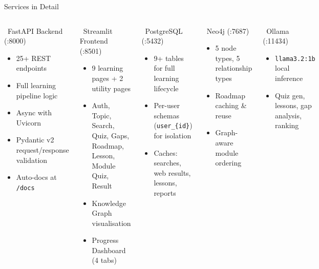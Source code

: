\documentclass[aspectratio=169,9pt]{beamer}
\begin{document}
\begin{frame}{Services in Detail}
\begin{columns}[T]
  \begin{block}{\faCode\ FastAPI Backend (:8000)}
    \begin{itemize}
      \item 25+ REST endpoints
      \item Full learning pipeline logic
      \item Async with Uvicorn
      \item Pydantic v2 request/response validation
      \item Auto-docs at \texttt{/docs}
    \end{itemize}
  \end{block}
  \begin{block}{\faDesktop\ Streamlit Frontend (:8501)}
    \begin{itemize}
      \item 9 learning pages + 2 utility pages
      \item Auth, Topic, Search, Quiz, Gaps,\\Roadmap, Lesson, Module Quiz, Result
      \item Knowledge Graph visualisation
      \item Progress Dashboard (4 tabs)
    \end{itemize}
  \end{block}

  \begin{block}{\faDatabase\ PostgreSQL (:5432)}
    \begin{itemize}
      \item 9+ tables for full learning lifecycle
      \item Per-user schemas (\texttt{user\_\{id\}}) for isolation
      \item Caches: searches, web results, lessons, reports
    \end{itemize}
  \end{block}
  \begin{block}{\faProjectDiagram\ Neo4j (:7687)}
    \begin{itemize}
      \item 5 node types, 5 relationship types
      \item Roadmap caching \& reuse
      \item Graph-aware module ordering
    \end{itemize}
  \end{block}
  \begin{block}{\faBrain\ Ollama (:11434)}
    \begin{itemize}
      \item \texttt{llama3.2:1b} local inference
      \item Quiz gen, lessons, gap analysis, ranking
    \end{itemize}
  \end{block}
\end{columns}
\end{frame}
\end{document}
